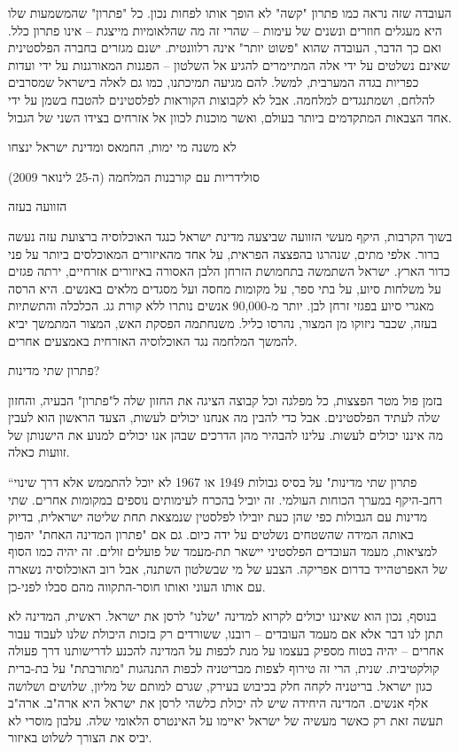 העובדה שזה נראה כמו פתרון "קשה" לא הופך אותו לפחות נכון. כל "פתרון" שהמשמעות שלו היא מעגלים חוזרים ונשנים של עימות – שהרי זה מה שהלאומיות מייצגת – אינו פתרון כלל. ואם כך הדבר, העובדה שהוא "פשוט יותר" אינה רלוונטית. ישנם מגזרים בחברה הפלסטינית שאינם נשלטים על ידי אלה המתיימרים להגיע אל השלטון – הפגנות המאורגנות על ידי ועדות כפריות בגדה המערבית, למשל. להם מגיעה תמיכתנו, כמו גם לאלה בישראל שמסרבים להלחם, ושמתנגדים למלחמה. אבל לא לקבוצות הקוראות לפלסטינים להטבח בשמן על ידי אחד הצבאות המתקדמים ביותר בעולם, ואשר מוכנות לכוון אל אזרחים בצידו השני של הגבול.

לא משנה מי ימות, החמאס ומדינת ישראל ינצחו

סולידריות עם קורבנות המלחמה (ה-25 לינואר 2009)

הזוועה בעזה

בשוך הקרבות, היקף מעשי הזוועה שביצעה מדינת ישראל כנגד האוכלוסיה ברצועת עזה נעשה ברור. אלפי מתים, שנהרגו בהפצצה הפראית, על אחד מהאיזורים המאוכלסים ביותר על פני כדור הארץ. ישראל השתמשה בתחמושת הזרחן הלבן האסורה באיזורים אזרחיים, ירתה פגזים על משלחות סיוע, על בתי ספר, על מקומות מחסה ועל מסגדים מלאים באנשים. היא הרסה מאגרי סיוע בפגזי זרחן לבן. יותר מ-90,000 אנשים נותרו ללא קורת גג. הכלכלה והתשתיות בעזה, שכבר ניזוקו מן המצור, נהרסו כליל. משנחתמה הפסקת האש, המצור המתמשך יביא להמשך המלחמה נגד האוכלוסיה האזרחית באמצעים אחרים.

פתרון שתי מדינות?

בזמן פול מטר הפצצות, כל מפלגה וכל קבוצה הציגה את החזון שלה ל"פתרון" הבעיה, והחזון שלה לעתיד הפלסטינים. אבל כדי להבין מה אנחנו יכולים לעשות, הצעד הראשון הוא לעבין מה איננו יכולים לעשות. עלינו להבהיר מהן הדרכים שבהן אנו יכולים למנוע את הישנותן של זוועות כאלה.

“פתרון שתי מדינות" על בסיס גבולות 1949 או 1967 לא יוכל להתממש אלא דרך שינוי רחב-היקף במערך הכוחות העולמי. זה יוביל בהכרח לעימותים נוספים במקומות אחרים. שתי מדינות עם הגבולות כפי שהן כעת יובילו לפלסטין שנמצאת תחת שליטה ישראלית, בדיוק באותה המידה שהשטחים נשלטים על ידה כיום. גם אם "פתרון המדינה האחת" יהפוך למציאות, מעמד העובדים הפלסטיני יישאר תת-מעמד של פועלים זולים. זה יהיה כמו הסוף של האפרטהייד בדרום אפריקה. הצבע של מי שבשלטון השתנה, אבל רוב האוכלוסיה נשארה עם אותו העוני ואותו חוסר-התקווה מהם סבלו לפני-כן.

בנוסף, נכון הוא שאיננו יכולים לקרוא למדינה "שלנו" לרסן את ישראל. ראשית, המדינה לא תתן לנו דבר אלא אם מעמד העובדים – רובנו, ששורדים רק בזכות היכולת שלנו לעבוד עבור אחרים – יהיה בטוח מספיק בעצמו על מנת לכפות על המדינה להכנע לדרישותנו דרך פעולה קולקטיבית. שנית, הרי זה טירוף לצפות מבריטניה לכפות התנהגות "מתורבתת" על בת-ברית כגון ישראל. בריטניה לקחה חלק בכיבוש בעירק, שגרם למותם של מליון, שלושים ושלושה אלף אנשים. המדינה היחידה שיש לה יכולת כלשהי לרסן את ישראל היא ארה"ב. ארה"ב תעשה זאת רק כאשר מעשיה של ישראל יאיימו על האינטרס הלאומי שלה. עלבון מוסרי לא יביס את הצורך לשלוט באיזור.

